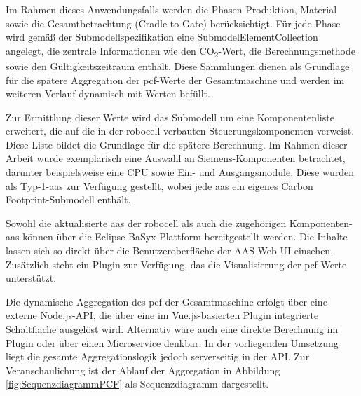 Im Rahmen dieses Anwendungsfalls werden die Phasen Produktion, Material sowie die Gesamtbetrachtung (Cradle to Gate) berücksichtigt. 
Für jede Phase wird gemäß der Submodellspezifikation eine SubmodelElementCollection angelegt, die zentrale Informationen wie den CO\textsubscript{2}-Wert, die Berechnungsmethode sowie den Gültigkeitszeitraum enthält. 
Diese Sammlungen dienen als Grundlage für die spätere Aggregation der \acs{pcf}-Werte der Gesamtmaschine und werden im weiteren Verlauf dynamisch mit Werten befüllt.

Zur Ermittlung dieser Werte wird das Submodell um eine Komponentenliste erweitert, die auf die in der robocell verbauten Steuerungskomponenten verweist. 
Diese Liste bildet die Grundlage für die spätere Berechnung. 
Im Rahmen dieser Arbeit wurde exemplarisch eine Auswahl an Siemens-Komponenten betrachtet, darunter beispielsweise eine CPU sowie Ein- und Ausgangsmodule. 
Diese wurden als Typ-1-\acs{aas} zur Verfügung gestellt, wobei jede \acs{aas} ein eigenes Carbon Footprint-Submodell enthält.

Sowohl die aktualisierte \acs{aas} der robocell als auch die zugehörigen Komponenten-\acs{aas} können über die Eclipse BaSyx-Plattform bereitgestellt werden. 
Die Inhalte lassen sich so direkt über die Benutzeroberfläche der AAS Web UI einsehen. 
Zusätzlich steht ein Plugin zur Verfügung, das die Visualisierung der \acs{pcf}-Werte unterstützt.

Die dynamische Aggregation des \acs{pcf} der Gesamtmaschine erfolgt über eine externe Node.js-API, die über eine im Vue.js-basierten Plugin integrierte Schaltfläche ausgelöst wird. 
Alternativ wäre auch eine direkte Berechnung im Plugin oder über einen Microservice denkbar. 
In der vorliegenden Umsetzung liegt die gesamte Aggregationslogik jedoch serverseitig in der API.
Zur Veranschaulichung ist der Ablauf der Aggregation in Abbildung \ref{fig:SequenzdiagrammPCF}  als Sequenzdiagramm dargestellt.

